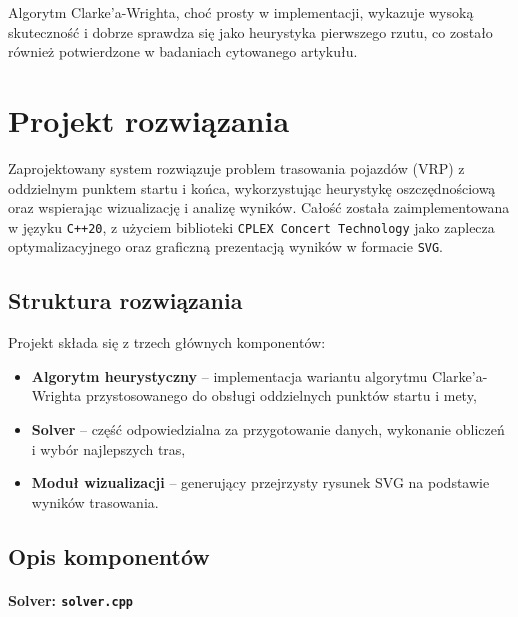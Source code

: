 \documentclass{article}
\begin{document}
Algorytm Clarke’a-Wrighta, choć prosty w implementacji, wykazuje wysoką skuteczność i dobrze sprawdza się jako heurystyka pierwszego rzutu, co zostało również potwierdzone w badaniach cytowanego artykułu.

\section{Projekt rozwiązania}

Zaprojektowany system rozwiązuje problem trasowania pojazdów (VRP) z oddzielnym punktem startu i końca, wykorzystując heurystykę oszczędnościową oraz wspierając wizualizację i analizę wyników. Całość została zaimplementowana w języku \texttt{C++20}, z użyciem biblioteki \texttt{CPLEX Concert Technology} jako zaplecza optymalizacyjnego oraz graficzną prezentacją wyników w formacie \texttt{SVG}.

\subsection*{Struktura rozwiązania}

Projekt składa się z trzech głównych komponentów:
\begin{itemize}
    \item \textbf{Algorytm heurystyczny} -- implementacja wariantu algorytmu Clarke’a-Wrighta przystosowanego do obsługi oddzielnych punktów startu i mety,
    \item \textbf{Solver} -- część odpowiedzialna za przygotowanie danych, wykonanie obliczeń i wybór najlepszych tras,
    \item \textbf{Moduł wizualizacji} -- generujący przejrzysty rysunek SVG na podstawie wyników trasowania.
\end{itemize}

\subsection*{Opis komponentów}

\paragraph{Solver: \texttt{solver.cpp}}
\end{document}
